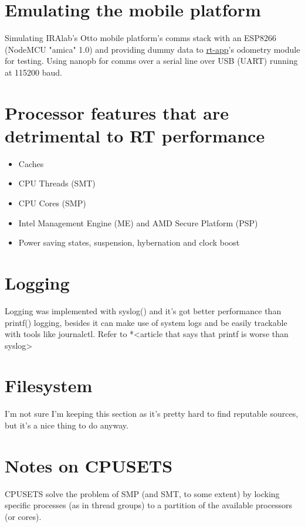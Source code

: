 \documentclass[a4paper,12pt]{report}
\begin{document}
\section{Emulating the mobile platform}

Simulating IRAlab's Otto mobile platform's comms stack with an ESP8266 (NodeMCU "amica" 1.0) and
providing dummy data to \href{https://github.com/iralabdisco/rt-app}{rt-app}'s odometry module for testing. Using nanopb for comms over a serial line over USB (UART) running at 115200 baud. 


\section{Processor features that are detrimental to RT performance}

\begin{itemize}
    \item Caches
    \item CPU Threads (SMT)
    \item CPU Cores (SMP)
    \item Intel Management Engine (ME) and AMD Secure Platform (PSP)
    \item Power saving states, suspension, hybernation and clock boost
\end{itemize}

\section{Logging}

Logging was implemented with syslog() and it's got better performance than printf() logging, besides it can make use of system logs and be easily trackable with tools like journalctl. Refer to *<article that says that printf is worse than syslog>

\section{Filesystem}

I'm not sure I'm keeping this section as it's pretty hard to find reputable sources, but it's a nice thing to do anyway. 

\section{Notes on CPUSETS} %

CPUSETS solve the problem of SMP (and SMT, to some extent) by locking specific processes (as in thread groups) to a partition of the available processors (or cores).


\printbibliography
\end{document}
